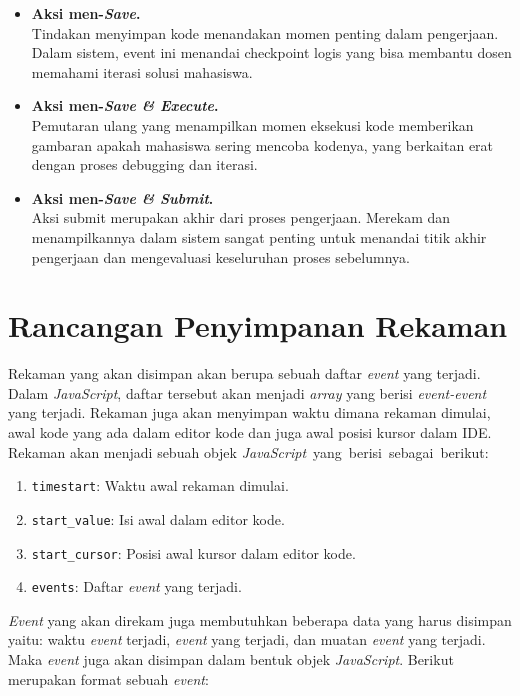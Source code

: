 \begin{itemize}
    \item \textbf{Aksi men-\textit{Save}.} \\
    Tindakan menyimpan kode menandakan momen penting dalam pengerjaan. Dalam sistem, event ini menandai checkpoint logis yang bisa membantu dosen memahami iterasi solusi mahasiswa.

    \item \textbf{Aksi men-\textit{Save \& Execute}.} \\
    Pemutaran ulang yang menampilkan momen eksekusi kode memberikan gambaran apakah mahasiswa sering mencoba kodenya, yang berkaitan erat dengan proses debugging dan iterasi.

    \item \textbf{Aksi men-\textit{Save \& Submit}.} \\
    Aksi submit merupakan akhir dari proses pengerjaan. Merekam dan menampilkannya dalam sistem sangat penting untuk menandai titik akhir pengerjaan dan mengevaluasi keseluruhan proses sebelumnya.
\end{itemize}

\section{Rancangan Penyimpanan Rekaman}
\label{sec:4:2:storerekaman}

Rekaman yang akan disimpan akan berupa sebuah daftar \textit{event} yang terjadi. Dalam \textit{JavaScript}, daftar tersebut akan menjadi \textit{array} yang berisi \textit{event-event} yang terjadi. Rekaman juga akan menyimpan waktu dimana rekaman dimulai, awal kode yang ada dalam editor kode dan juga awal posisi kursor dalam IDE. Rekaman akan menjadi sebuah objek \mbox{\textit{JavaScript} yang berisi sebagai berikut:}

\begin{enumerate}
    \item \verb|timestart|: Waktu awal rekaman dimulai.
    \item \verb|start_value|: Isi awal dalam editor kode.
    \item \verb|start_cursor|: Posisi awal kursor dalam editor kode.
    \item \verb|events|: Daftar \textit{event} yang terjadi.
\end{enumerate}

\textit{Event} yang akan direkam juga membutuhkan beberapa data yang harus disimpan yaitu: waktu \textit{event} terjadi, \textit{event} yang terjadi, dan muatan \textit{event} yang terjadi. Maka \textit{event} juga akan disimpan dalam bentuk objek \textit{JavaScript}. Berikut merupakan format sebuah \textit{event}:

